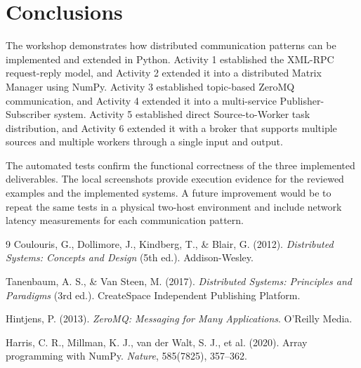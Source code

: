 \documentclass[11pt,a4paper]{article}
\begin{document}
\section{Conclusions}

The workshop demonstrates how distributed communication patterns can be
implemented and extended in Python. Activity 1 established the XML-RPC
request-reply model, and Activity 2 extended it into a distributed Matrix
Manager using NumPy. Activity 3 established topic-based ZeroMQ communication,
and Activity 4 extended it into a multi-service Publisher-Subscriber system.
Activity 5 established direct Source-to-Worker task distribution, and Activity 6
extended it with a broker that supports multiple sources and multiple workers
through a single input and output.

The automated tests confirm the functional correctness of the three implemented
deliverables. The local screenshots provide execution evidence for the reviewed
examples and the implemented systems. A future improvement would be to repeat
the same tests in a physical two-host environment and include network latency
measurements for each communication pattern.

\begin{thebibliography}{9}
Coulouris, G., Dollimore, J., Kindberg, T., \& Blair, G. (2012).
\textit{Distributed Systems: Concepts and Design} (5th ed.). Addison-Wesley.

Tanenbaum, A. S., \& Van Steen, M. (2017).
\textit{Distributed Systems: Principles and Paradigms} (3rd ed.). CreateSpace Independent Publishing Platform.

Hintjens, P. (2013).
\textit{ZeroMQ: Messaging for Many Applications}. O'Reilly Media.

Harris, C. R., Millman, K. J., van der Walt, S. J., et al. (2020).
Array programming with NumPy. \textit{Nature}, 585(7825), 357--362.
\end{thebibliography}
\end{document}
